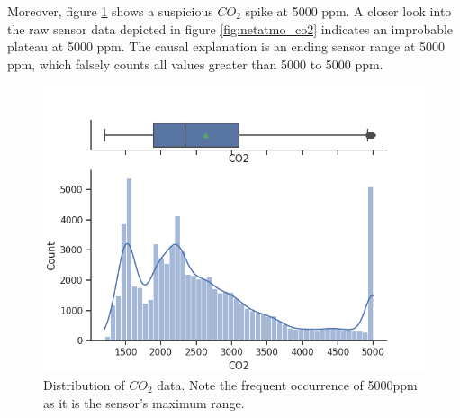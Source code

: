 \documentclass[conference]{IEEEtran}
\begin{document}
Moreover, figure \ref{fig:co2} shows a suspicious $CO_2$ spike at 5000 ppm. A closer look into the raw sensor data depicted in figure \ref{fig:netatmo_co2} indicates an improbable plateau at 5000 ppm. The causal explanation is an ending sensor range at 5000 ppm, which falsely counts all values greater than 5000 to 5000 ppm.

\begin{figure}[htbp]
\begin{center}
\includegraphics[width=1\linewidth]{figs/CO2.png}
\caption{Distribution of $CO_2$ data. Note the frequent occurrence of 5000ppm as it is the sensor's maximum range.}
\label{fig:co2}
\end{center}
\end{figure}
\end{document}

